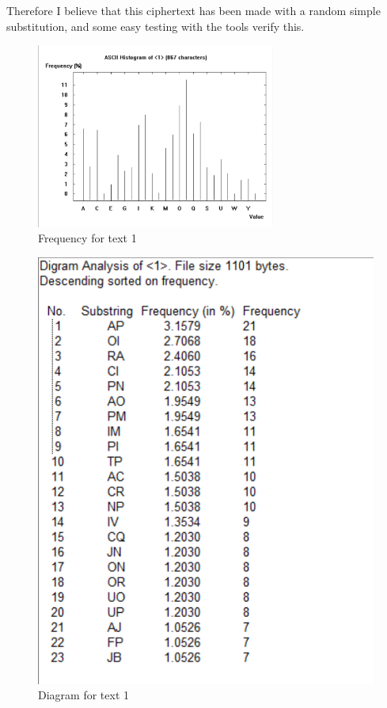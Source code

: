 Therefore I believe that this ciphertext has been made with a random simple substitution, and some easy testing with the tools verify this.

\begin{figure}[ht!]
    \begin{center}
        \includegraphics[width=0.7\textwidth]{assets/1_frequency.png}
        \caption{Frequency for text 1}
        \label{fig:1freq}
    \end{center}
\end{figure}

\begin{figure}[ht!]
    \begin{center}
        \includegraphics[height=0.8\textwidth]{assets/1_diagram.png}
        \caption{Diagram for text 1}
        \label{fig:1diagram}
    \end{center}
\end{figure}

